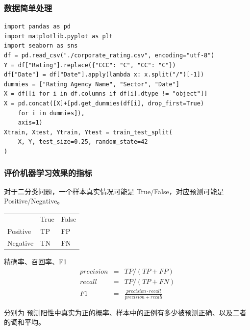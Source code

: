 \documentclass[mathserif,envcountsect,fontset=mac]{ctexbeamer}
\begin{document}
\begin{frame}[fragile]
    \frametitle{数据简单处理}
    \begin{verbatim}
import pandas as pd
import matplotlib.pyplot as plt
import seaborn as sns
df = pd.read_csv("./corporate_rating.csv", encoding="utf-8")
Y = df["Rating"].replace({"CCC": "C", "CC": "C"})
df["Date"] = df["Date"].apply(lambda x: x.split("/")[-1])
dummies = ["Rating Agency Name", "Sector", "Date"]
X = df[[i for i in df.columns if df[i].dtype != "object"]]
X = pd.concat([X]+[pd.get_dummies(df[i], drop_first=True)
    for i in dummies]),
    axis=1)
Xtrain, Xtest, Ytrain, Ytest = train_test_split(
    X, Y, test_size=0.25, random_state=42
)
\end{verbatim}
\end{frame}
\begin{frame}
    \frametitle{评价机器学习效果的指标}
    对于二分类问题，一个样本真实情况可能是 True/False，对应预测可能是 Positive/Negative。
    \begin{center}
        \begin{tabular}{lll}
                     & True & False \\
            Positive & TP   & FP    \\
            Negative & TN   & FN    \\
        \end{tabular}
    \end{center}
    \begin{definition}{精确率、召回率、F1}
        \begin{eqnarray}
            precision & = & TP / (TP + FP) \nonumber\\
            recall & = & TP / (TP + FN) \nonumber\\
            F1 & = & \frac{precision\cdot recall}{precision+recall}\nonumber
        \end{eqnarray}
    \end{definition}
    分别为 预测阳性中真实为正的概率、样本中的正例有多少被预测正确、以及二者的调和平均。
\end{frame}
\end{document}
